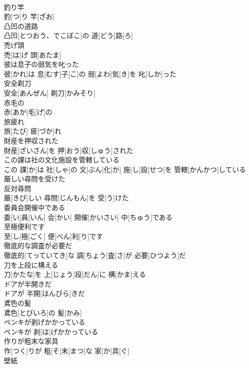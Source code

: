 \documentclass[8pt]{extreport}
\begin{document}
\begin{CJK}{UTF8}{min}
\\	釣り竿	
\\	釣[つ]り 竿[ざお]
\\	凸凹の道路	
\\	凸凹[とつおう、でこぼこ]の 道[どう]路[ろ]
\\	禿げ頭	
\\	禿[は]げ 頭[あたま]
\\	彼は息子の弱気を叱った	
\\	彼[かれ]は 息[むす]子[こ]の 弱[よわ]気[き]を 叱[しか]った
\\	安全剃刀	
\\	安全[あんぜん] 剃刀[かみそり]
\\	赤毛の	
\\	赤[あか]毛[げ]の
\\	旅疲れ	
\\	旅[たび] 疲[づか]れ
\\	財産を押収された	
\\	財産[ざいさん]を 押[おう]収[しゅう]された
\\	この課は社の文化施設を管轄している	
\\	この 課[か]は 社[しゃ]の 文[ぶん]化[か] 施[し]設[せつ]を 管轄[かんかつ]している
\\	厳しい尋問を受けた	
\\	反対尋問 
\\	厳[きび]しい 尋問[じんもん]を 受[う]けた
\\	委員会開催中である	
\\	委[い]員[いん] 会[かい] 開催[かいさい] 中[ちゅう]である
\\	至極便利です	
\\	至[し]極[ごく] 便[べん]利[り]です
\\	徹底的な調査が必要だ	
\\	徹底的[てっていてき]な 調[ちょう]査[さ]が 必要[ひつよう]だ
\\	刀を上段に構える	
\\	刀[かたな]を 上[じょう]段[だん]に 構[かま]える
\\	ドアが半開きだ	
\\	ドアが 半開[はんびら]きだ
\\	鳶色の髪	
\\	鳶色[とびいろ]の 髪[かみ]
\\	ペンキが剥げかかっている	
\\	ペンキが 剥[は]げかかっている
\\	作りが粗末な家具	
\\	作[つく]りが 粗[そ]末[まつ]な 家[か]具[ぐ]
\\	壁紙	

\end{CJK}
\end{document}
